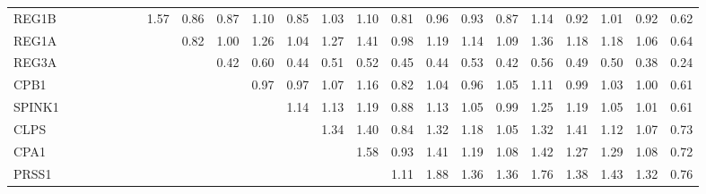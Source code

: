 \begin{longtable}{lrrrrrrrrrrrrrrrrrrrrrr}
REG1B    &              &              &              &              &             &             &        1.57 &        0.86 &       0.87 &         1.10 &       0.85 &       1.03 &        1.10 &      0.81 &        0.96 &           0.93 &          0.87 &      1.14 &        0.92 &        1.01 &       0.92 &       0.62 \\
REG1A    &              &              &              &              &             &             &             &        0.82 &       1.00 &         1.26 &       1.04 &       1.27 &        1.41 &      0.98 &        1.19 &           1.14 &          1.09 &      1.36 &        1.18 &        1.18 &       1.06 &       0.64 \\
REG3A    &              &              &              &              &             &             &             &             &       0.42 &         0.60 &       0.44 &       0.51 &        0.52 &      0.45 &        0.44 &           0.53 &          0.42 &      0.56 &        0.49 &        0.50 &       0.38 &       0.24 \\
CPB1     &              &              &              &              &             &             &             &             &            &         0.97 &       0.97 &       1.07 &        1.16 &      0.82 &        1.04 &           0.96 &          1.05 &      1.11 &        0.99 &        1.03 &       1.00 &       0.61 \\
SPINK1   &              &              &              &              &             &             &             &             &            &              &       1.14 &       1.13 &        1.19 &      0.88 &        1.13 &           1.05 &          0.99 &      1.25 &        1.19 &        1.05 &       1.01 &       0.61 \\
CLPS     &              &              &              &              &             &             &             &             &            &              &            &       1.34 &        1.40 &      0.84 &        1.32 &           1.18 &          1.05 &      1.32 &        1.41 &        1.12 &       1.07 &       0.73 \\
CPA1     &              &              &              &              &             &             &             &             &            &              &            &            &        1.58 &      0.93 &        1.41 &           1.19 &          1.08 &      1.42 &        1.27 &        1.29 &       1.08 &       0.72 \\
PRSS1    &              &              &              &              &             &             &             &             &            &              &            &            &             &      1.11 &        1.88 &           1.36 &          1.36 &      1.76 &        1.38 &        1.43 &       1.32 &       0.76 \\

\end{longtable}
